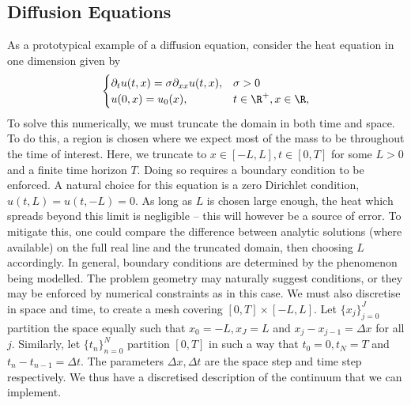 \subsection{Diffusion Equations}
As a prototypical example of a diffusion equation, consider the heat equation in one dimension given by 
\begin{equation}\label{eq:heat}
\begin{cases}
    \partial_t u(t,x) = \sigma\partial_{xx} u(t,x),&\sigma >0\\
        u(0,x) = u_0(x),  &t\in\R^+, x\in\R,
\end{cases}
\end{equation}
To solve this numerically, we must truncate the domain in both time and space. To do this, a region is chosen where we expect most of the mass to be throughout the time of interest. Here, we truncate to \(x \in [-L,L], t \in [0,T]\) for some \(L>0\) and a finite time horizon \(T\). Doing so requires a boundary condition to be enforced. A natural choice for this equation is a zero Dirichlet condition, \(u(t,L) = u(t,-L) = 0\). As long as \(L\) is chosen large enough, the heat which spreads beyond this limit is negligible -- this will however be a source of error. To mitigate this, one could compare the difference between analytic solutions (where available) on the full real line and the truncated domain, then choosing $L$ accordingly. In general, boundary conditions are determined by the phenomenon being modelled. The problem geometry may naturally suggest conditions, or they may be enforced by numerical constraints as in this case. We must also discretise in space and time, to create a mesh covering \(\left[0,T\right] \times \left[-L,L\right]\). Let \(\lbrace x_j\rbrace_{j=0}^J\) partition the space equally such that \(x_0 = -L, x_J=L\) and \(x_j-x_{j-1} = \Delta x\) for all \(j\). Similarly, let \(\lbrace t_n\rbrace_{n=0}^N\) partition \(\left[0,T\right]\) in such a way that \(t_0=0, t_N =T\) and \(t_n-t_{n-1} = \Delta t\). The parameters \(\Delta x, \Delta t\) are the space step and time step respectively. We thus have a discretised description of the continuum that we can implement. 

